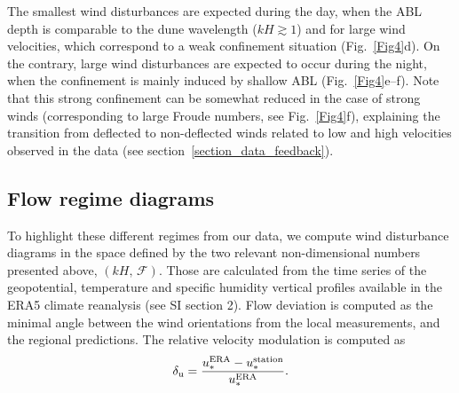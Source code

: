 
  The smallest wind disturbances are expected during the day, when the ABL depth is comparable to the dune wavelength ($k H \gtrsim 1$) and for large wind velocities, which correspond to a weak confinement situation (Fig.~\ref{Fig4}d). On the contrary, large wind disturbances are expected to occur during the night, when the confinement is mainly induced by shallow ABL (Fig.~\ref{Fig4}e--f). Note that this strong confinement can be somewhat reduced in the case of strong winds (corresponding to large Froude numbers, see Fig.~\ref{Fig4}f), explaining the transition from deflected to non-deflected winds related to low and high velocities observed in the data (see section~\ref{section_data_feedback}).

  \subsection{Flow regime diagrams}

  To highlight these different regimes from our data, we compute wind disturbance diagrams in the space defined by the two relevant non-dimensional numbers presented above, $\left(k H,\, \mathcal{F}\right)$. Those are calculated from the time series of the geopotential, temperature and specific humidity vertical profiles available in the ERA5 climate reanalysis (see SI section 2).
  Flow deviation is computed as the minimal angle between the wind orientations from the local measurements, and the regional predictions. The relative velocity modulation is computed as
  \begin{equation}
    \delta_{\textup{u}} = \frac{u_{*}^{\textup{ERA}} -  u_{*}^{\textup{station}}}{u_{*}^{\textup{ERA}}}.
  \end{equation}

